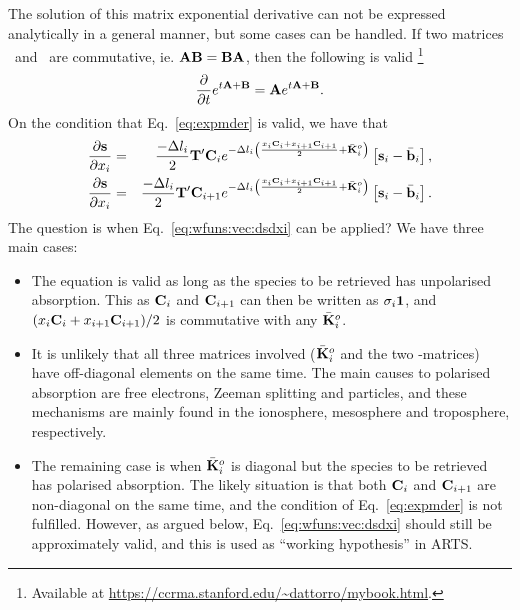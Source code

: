 The solution of this matrix exponential derivative can not be expressed
analytically in a general  manner, but some cases can be handled. If two
matrices \ and \ are commutative, ie.
$\mathbf{A}\mathbf{B}=\mathbf{B}\mathbf{A}$, then the following is valid
\citep{Dattorro2011}\footnote{Available at
  \url{https://ccrma.stanford.edu/~dattorro/mybook.html}.}
\begin{equation}
  \label{eq:expmder}
  \frac{\partial}{\partial t} e^{t\mathbf{A}+\mathbf{B}} = 
       \mathbf{A}e^{t\mathbf{A}+\mathbf{B}}.
\end{equation}
On the condition that Eq.~\ref{eq:expmder} is valid, we have that
\begin{eqnarray}
  \label{eq:wfuns:vec:dsdxi}
  \frac{\partial{\bf s}}{\partial x_{i}} &=&  
  \frac{-\Delta l_{i}}{2} \mathbf{T}' \mathbf{C}_i
  e^{-\Delta l_{i}\left(\frac{x_{i}\mathbf{C}_i+
            x_{i+1}\mathbf{C}_{i+1}}{2} + \bar{{\bf K}}_i^o \right)}
   \left[ {\bf s}_{i}-\bar{{\bf b}}_i\right], \\
  \frac{\partial{\bf s}}{\partial x_{i}} &=&  
  \frac{-\Delta l_{i}}{2} \mathbf{T}' \mathbf{C}_{i+1}
  e^{-\Delta l_{i}\left(\frac{x_{i}\mathbf{C}_i+
            x_{i+1}\mathbf{C}_{i+1}}{2} + \bar{{\bf K}}_i^o \right)}
   \left[ {\bf s}_{i}-\bar{{\bf b}}_i\right]. \nonumber
\end{eqnarray}
The question is when Eq.~\ref{eq:wfuns:vec:dsdxi} can be applied? We have three
main cases:
\begin{itemize}
\item The equation is valid as long as the species to be retrieved has
  unpolarised absorption. This as $\mathbf{C}_i$ and $\mathbf{C}_{i+1}$ can
  then be written as $\sigma_i\mathbf{1}$, and
  $(x_{i}\mathbf{C}_i+x_{i+1}\mathbf{C}_{i+1})/2$ is commutative
  with any $\bar{{\bf K}}_i^o$.
\item It is unlikely that all three matrices involved ($\bar{{\bf K}}_i^o$ and
  the two -matrices) have off-diagonal elements on the same time. The
  main causes to polarised absorption are free electrons, Zeeman splitting and
  particles, and these mechanisms are mainly found in the ionosphere,
  mesosphere and troposphere, respectively.
\item The remaining case is when $\bar{{\bf K}}_i^o$ is diagonal but the
  species to be retrieved has polarised absorption. The likely situation is
  that both $\mathbf{C}_i$ and $\mathbf{C}_{i+1}$ are non-diagonal on the same
  time, and the condition of Eq.~\ref{eq:expmder} is not fulfilled. However, as
  argued below, Eq.~\ref{eq:wfuns:vec:dsdxi} should still be approximately
  valid, and this is used as ``working hypothesis'' in ARTS.
\end{itemize}
